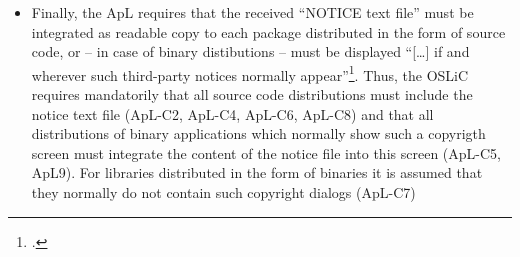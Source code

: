 \begin{itemize}
  \item Finally, the ApL requires that the received “NOTICE text file” must be
  integrated as readable copy to each package distributed in the form of source
  code, or – in case of binary distibutions – must be displayed
  \enquote{[\ldots] if and wherever such third-party notices normally
  appear}\footcite[cf.][\nopage wp.\ §4.4]{Apl20OsiLicense2004a}. Thus, the OSLiC
  requires mandatorily that all source code distributions must include the
  notice text file (ApL-C2, ApL-C4, ApL-C6, ApL-C8) and that all distributions of
  binary applications which normally show such a copyrigth screen must integrate
  the content of the notice file into this screen (ApL-C5, ApL9). For libraries
  distributed in the form of binaries it is assumed that they normally do not
  contain such copyright dialogs (ApL-C7)
\end{itemize}








%
